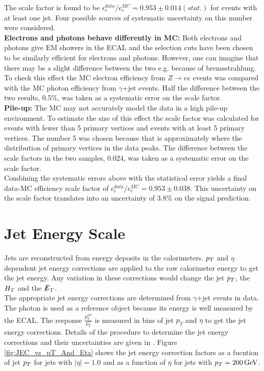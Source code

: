 The scale factor is found to be $\epsilon_{e}^{data}/\epsilon_{e}^{MC} =
0.953\pm 0.014(stat.)$ for events with at least one jet. Four possible sources
of systematic uncertainty on this number were considered. \\

{\bf Electrons and photons behave differently in MC:} Both electrons and photons
give EM showers in the ECAL and the selection cuts have been chosen to be
similarly efficient for electrons and photons. However, one can imagine that
there may be a slight difference between the two e.g. because of bremsstrahlung.
To check this effect the MC electron efficiency from $Z\rightarrow ee$ events
was compared with the MC photon efficiency from $\gamma$+jet events. Half the
difference between the two results, 0.5\unit{\%}, was taken as a systematic 
error on the scale factor. \\

{\bf Pile-up:} The MC may not accurately model the data in a high pile-up
environment. To estimate the size of this effect the scale factor was calculated
for events with fewer than 5 primary vertices and events with at least 5 primary
vertices. The number 5 was chosen because that is approximately where the 
distribution of primary vertices in the data peaks. The difference between the
scale factors in the two samples, 0.024, was taken as a systematic error on the 
scale factor. \\

Combining the systematic errors above with the statistical error yields a final
data-MC efficiency scale factor of $\epsilon_{e}^{data}/\epsilon_{e}^{MC} =
0.953\pm0.038$. This uncertainty on the scale factor translates into an 
uncertainty of 3.8\% on the signal prediction.

\section{Jet Energy Scale}

Jets are reconstructed from energy deposits in the calorimeters. $p_{T}$ and
$\eta$ dependent jet energy corrections are applied to the raw calorimeter 
energy to get the jet energy. Any variation in these corrections would change 
the jet $p_{T}$, the $H_{T}$ and the $\slashed{E}_{T}$. \\

The appropriate jet energy corrections are determined from $\gamma$+jet events
in data. The photon is used as a reference object because its energy is well 
measured by the ECAL. The response $\frac{p_{T}^{jet}}{p_{T}^{\gamma}}$
is measured in bins of jet $p_{T}$ and $\eta$ to get the jet energy corrections. 
Details of the procedure to determine the jet energy corrections and their 
uncertainties are given in \cite{jec}. Figure \ref{fig:JEC_vs_pT_And_Eta} shows 
the jet energy correction factors as a fucntion of jet $p_{T}$ for jets with 
$|\eta| = 1.0$ and as a function of $\eta$ for jets with $p_{T} = 200 \, \mathrm{GeV}$. 
\\

